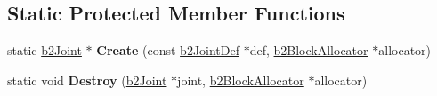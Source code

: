 \subsection*{Static Protected Member Functions}
\begin{DoxyCompactItemize}
\item 
\hypertarget{classb2_joint_a2e500c93107d0bf6b0a21654528faeab}{static \hyperlink{classb2_joint}{b2\-Joint} $\ast$ {\bfseries Create} (const \hyperlink{structb2_joint_def}{b2\-Joint\-Def} $\ast$def, \hyperlink{classb2_block_allocator}{b2\-Block\-Allocator} $\ast$allocator)}\label{classb2_joint_a2e500c93107d0bf6b0a21654528faeab}

\item 
\hypertarget{classb2_joint_acf52946b6672d77f268b849ccb09e003}{static void {\bfseries Destroy} (\hyperlink{classb2_joint}{b2\-Joint} $\ast$joint, \hyperlink{classb2_block_allocator}{b2\-Block\-Allocator} $\ast$allocator)}\label{classb2_joint_acf52946b6672d77f268b849ccb09e003}

\end{DoxyCompactItemize}
